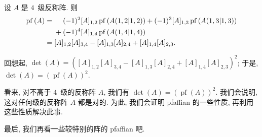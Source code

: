 \begin{example}
    设 \(A\) 是 \(4\)~级反称阵.
    则
    \begin{align*}
        \operatorname{pf} {(A)}
        = {} &
        \hphantom{{} + {}}
        (-1)^2 [A]_{1,2} \operatorname{pf} {(A({1,2}|{1,2}))}
        +
        (-1)^3 [A]_{1,3} \operatorname{pf} {(A({1,3}|{1,3}))}
        \\
             &
        +
        (-1)^4 [A]_{1,4} \operatorname{pf} {(A({1,4}|{1,4}))}
        \\
        = {} &
        [A]_{1,2} [A]_{3,4}
        - [A]_{1,3} [A]_{2,4}
        + [A]_{1,4} [A]_{2,3}.
    \end{align*}

    回想起, \(\det {(A)} =
    ([A]_{1,2} [A]_{3,4}
    - [A]_{1,3} [A]_{2,4}
    + [A]_{1,4} [A]_{2,3})^2\);
    于是, \(\det {(A)} = (\operatorname{pf} {(A)})^2\).
\end{example}

看来, 对不高于 \(4\)~级的反称阵 \(A\),
我们有 \(\det {(A)} = (\operatorname{pf} {(A)})^2\).
我们会说明, 这对任何级的反称阵 \(A\) 都是对的.
为此, 我们会证明 pfaffian 的一些性质,
再利用这些性质解决此事.

最后, 我们再看一些较特别的阵的 pfaffian 吧.

